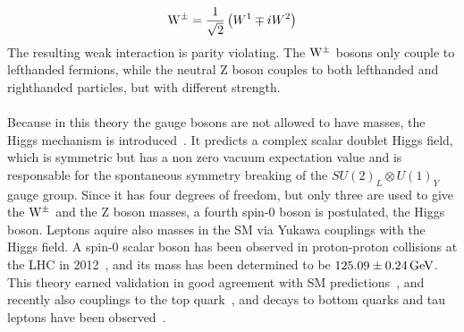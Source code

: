 \begin{equation}
  \mathrm{W}^\pm = \frac{1}{\sqrt{2}}\left(W^1\mp i W^2\right)
\end{equation}
The resulting weak interaction is parity violating. The $\mathrm{W}^\pm$ bosons only couple to lefthanded fermions, while the neutral Z boson couples to both lefthanded and righthanded particles, but with different strength.\\
\\Because in this theory the gauge bosons are not allowed to have masses, the Higgs mechanism is introduced~\cite{Higgs1,Higgs2,Higgs3}. It predicts a complex scalar doublet Higgs field, which is symmetric but has a non zero vacuum expectation value and is responsable for the spontaneous symmetry breaking of the $ SU(2)_L\otimes U(1)_Y$ gauge group. Since it has four degrees of freedom, but only three are used to give the $\mathrm{W}^\pm$ and the Z boson masses, a fourth spin-0 boson is postulated, the Higgs boson. Leptons aquire also masses in the SM via Yukawa couplings with the Higgs field. A spin-0 scalar boson has been observed in proton-proton collisions at the LHC in 2012~\cite{HiggsCMS,HiggsATLAS}, and its mass has been determined to be $125.09\pm0.24\,\text{Ge\hspace{-.08em}V}$. This theory earned validation in good agreement with SM predictions~\cite{HiggsPrecise}, and recently also couplings to the top quark~\cite{ttH}, and decays to bottom quarks and tau leptons have been observed~\cite{HiggsTauTau,HiggsBB}.





